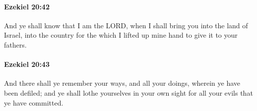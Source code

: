 		\paragraph{Ezekiel 20:42} %
			\label{EZEKIEL-20-42}

			And ye shall know that I am the LORD, when I shall bring you into the land of Israel, into the country for the which I lifted up mine hand to give it to your fathers.


		\paragraph{Ezekiel 20:43} %
			\label{EZEKIEL-20-43}

			And there shall ye remember your ways, and all your doings, wherein ye have been defiled; and ye shall lothe yourselves in your own sight for all your evils that ye have committed.


